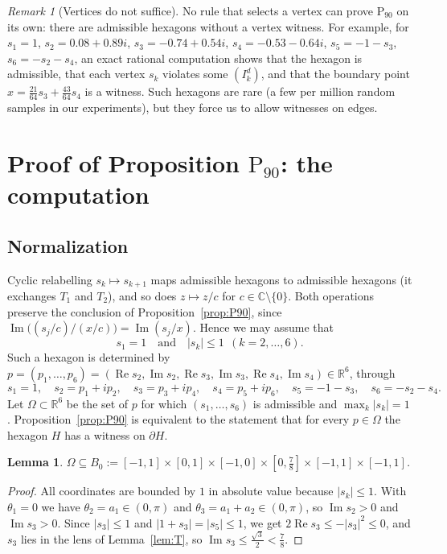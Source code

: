 \documentclass[11pt]{amsart}
\newtheorem{lemma}[theorem]{Lemma}
\theoremstyle{definition}
\theoremstyle{remark}
\newtheorem{remark}[theorem]{Remark}
\newcommand{\C}{\mathbb{C}}
\newcommand{\R}{\mathbb{R}}
\renewcommand{\Im}{\operatorname{Im}}
\renewcommand{\Re}{\operatorname{Re}}
\newcommand{\Pn}{\mathrm{P}_{90}}
\newcommand{\sq}{\tfrac{\sqrt3}{2}}
\begin{document}
\begin{remark}[Vertices do not suffice]\label{rem:novertex}
No rule that selects a vertex can prove $\Pn$ on its own: there are admissible hexagons without a vertex witness. For example, for $s_1=1$, $s_2=0.08+0.89i$, $s_3=-0.74+0.54i$, $s_4=-0.53-0.64i$, $s_5=-1-s_3$, $s_6=-s_2-s_4$, an exact rational computation shows that the hexagon is admissible, that each vertex $s_k$ violates some $(I^d_k)$, and that the boundary point $x=\frac{21}{64}s_3+\frac{43}{64}s_4$ is a witness. Such hexagons are rare (a few per million random samples in our experiments), but they force us to allow witnesses on edges.
\end{remark}

\section{Proof of Proposition \texorpdfstring{$\Pn$}{P90}: the computation}\label{sec:computer}

\subsection{Normalization}
Cyclic relabelling $s_k\mapsto s_{k+1}$ maps admissible hexagons to admissible hexagons (it exchanges $T_1$ and $T_2$), and so does $z\mapsto z/c$ for $c\in\C\setminus\{0\}$. Both operations preserve the conclusion of Proposition~\ref{prop:P90}, since $\Im\bigl((s_j/c)/(x/c)\bigr)=\Im(s_j/x)$. Hence we may assume that
\[
s_1=1\quad\text{and}\quad\lvert s_k\rvert\le1\ \ (k=2,\dots,6).
\]
Such a hexagon is determined by $p=(p_1,\dots,p_6)=(\Re s_2,\Im s_2,\Re s_3,\Im s_3,\Re s_4,\Im s_4)\in\R^6$, through
\[
s_1=1,\quad s_2=p_1+ip_2,\quad s_3=p_3+ip_4,\quad s_4=p_5+ip_6,\quad s_5=-1-s_3,\quad s_6=-s_2-s_4 .
\]
Let $\Omega\subset\R^6$ be the set of $p$ for which $(s_1,\dots,s_6)$ is admissible and $\max_k\lvert s_k\rvert=1$. Proposition~\ref{prop:P90} is equivalent to the statement that for every $p\in\Omega$ the hexagon $H$ has a witness on $\partial H$.

\begin{lemma}\label{lem:box}
$\Omega\subseteq B_0:=[-1,1]\times[0,1]\times[-1,0]\times[0,\tfrac78]\times[-1,1]\times[-1,1]$.
\end{lemma}

\begin{proof}
All coordinates are bounded by $1$ in absolute value because $\lvert s_k\rvert\le1$. With $\theta_1=0$ we have $\theta_2=a_1\in(0,\pi)$ and $\theta_3=a_1+a_2\in(0,\pi)$, so $\Im s_2>0$ and $\Im s_3>0$. Since $\lvert s_3\rvert\le1$ and $\lvert1+s_3\rvert=\lvert s_5\rvert\le1$, we get $2\Re s_3\le-\lvert s_3\rvert^2\le0$, and $s_3$ lies in the lens of Lemma~\ref{lem:T}, so $\Im s_3\le\sq<\frac78$.
\end{proof}
\end{document}
